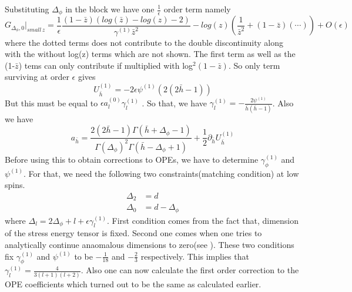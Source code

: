 \documentclass[12pt,a4paper,oneside]{book}
\theoremstyle{definition}
\begin{document}
        Substituting $\Delta_{\phi}$ in the block we have one $\frac{1}{\epsilon}$ order term namely 
        \begin{equation}
            G_{\Delta_{\phi},0}|_{small\hspace{2pt}z} =\frac{1}{\epsilon} \frac{(1-\bar{z})(log(\bar{z})-log(z)-2)}{\gamma^{(1)}\bar{z}^{2}} - log(z)(\frac{1}{\bar{z}^2}+ (1-\bar{z})(\cdots)) +  O(\epsilon)
        \end{equation} where the dotted terms does not contribute to the double discontinuity along with the without log(z) terms which are not shown. The first term as well as the (1-$\bar{z}$) tems can only contribute if multiplied with log$^2(1-\bar{z})$. So only term surviving at order $\epsilon$ gives
        \begin{equation}
            U_{\bar{h}}^{(1)} = -2\epsilon\psi^{(1)}(2(2\bar{h}-1))
        \end{equation}
        But this must be equal to $\epsilon a_l^{(0)}\gamma_l^{(1)}$ . So that, we have $\gamma_l^{(1)} = -\frac{2\psi^{(1)}}{\bar{h}(\bar{h}-1)}$. Also we have 
        \begin{equation}
            a_{\bar{h}} = \frac{2(2\bar{h}-1)\Gamma(\bar{h}+\Delta_{\phi}-1)}{\Gamma(\Delta_{\phi})^2\Gamma(\bar{h}-\Delta_{\phi}+1)} + \frac{1}{2}\partial_{\bar{h}}U_{\bar{h}}^{(1)}
        \end{equation} 
        Before using this to obtain corrections to OPEs, we have to determine $\gamma_{\phi}^{(1)}$ and $\psi^{(1)}$. For that, we need the following two constraints(matching condition) at low spins.
        \begin{subequations}
        \begin{align}
            \Delta_2 &= d\\
            \Delta_0  &= d-\Delta_{\phi}
        \end{align}
    \end{subequations}
        where $\Delta_{l} = 2\Delta_{\phi} + l + \epsilon\gamma_l^{(1)}$.
        First condition comes from the fact that, dimension of the stress energy tensor is fixed. Second one comes when one tries to analytically continue anaomalous dimensions to zero(see \cite{vasco}). These two conditions fix  $\gamma_{\phi}^{(1)}$ and $\psi^{(1)}$ to be $-\frac{1}{18}$ and $-\frac{2}{3}$ respectively. This implies that $\gamma_l^{(1)} = \frac{4}{3(l+1)(l+2)}$. Also one can now calculate the first order correction to the OPE coefficients which turned out to be the same as calculated earlier.
\end{document}
